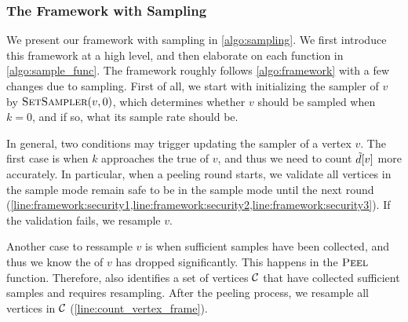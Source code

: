 \subsubsection{The Framework with Sampling} 
We present our framework with sampling in \cref{algo:sampling}. 
We first introduce this framework at a high level, and then elaborate on each function in \cref{algo:sample_func}. 
The framework roughly follows \cref{algo:framework} with a few changes due to sampling. 
First of all, we start with initializing the sampler of $v$ by ${\mbox{\sc{SetSampler}}}{}(v,0)$, 
which determines whether $v$ should be sampled when $k=0$, and if so, what its sample rate should be. 


In general, two conditions may trigger updating the sampler of a vertex $v$. 
The first case is when $k$ approaches the true \induceddegree{} of $v$, 
and thus we need to count $\tilde{d}[v]$ more accurately. 
In particular, %
when a peeling round starts, 
we validate all vertices in the sample mode remain safe to be in the sample mode until the next round (\cref{line:framework:security1,line:framework:security2,line:framework:security3}). 
If the validation fails, we resample $v$. 



Another case to ressample $v$ is when sufficient samples have been collected, and thus we know the \induceddegree{} of $v$ has dropped significantly. 
This happens in the ${\mbox{\sc{Peel}}}$ function. 
Therefore, \FPeel{} also identifies a set of vertices $\mathcal{C}$ that have collected sufficient samples and requires resampling. 
After the peeling process, we resample all vertices in $\mathcal{C}$ (\cref{line:count_vertex_frame}).

